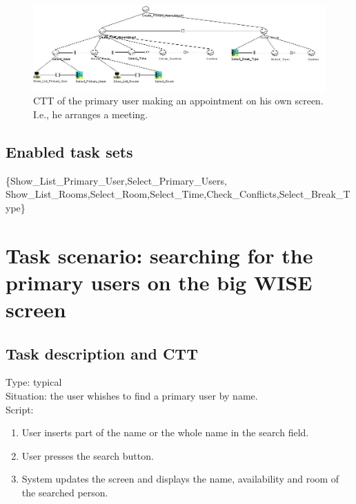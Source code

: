\documentclass[11pt, a4paper,svglistings]{report}
\begin{document}
\begin{figure}[H]
\centering
    \includegraphics[width=1\textwidth]{CreatePrimaryAppointment.jpg}
  \caption[Primary user makes his own appointment]{\label{fig:PrimaryUserAppointment}CTT of the primary user making an appointment on his own screen. I.e., he arranges a meeting.}
\end{figure}

\subsection{Enabled task sets}

\{Show\_List\_Primary\_User,Select\_Primary\_Users, \\ Show\_List\_Rooms,Select\_Room,Select\_Time,Check\_Conflicts,Select\_Break\_Type\}


\section{Task scenario: searching for the primary users on the big WISE screen}

\subsection{Task description and CTT}

\label{subsec:alphabetic}Type: typical \\
Situation: the user whishes to find a primary user by name. \\
Script:
\begin{enumerate}
\item User inserts part of the name or the whole name in the search field.
\item User presses the search button.
\item System updates the screen and displays the name, availability and room of the searched 
person.
\end{enumerate}
\end{document}
